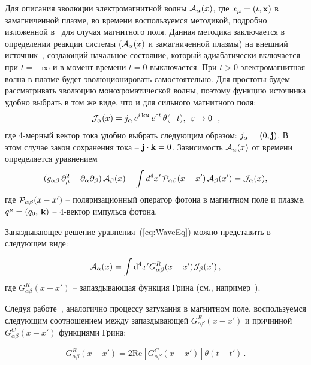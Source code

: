 \documentclass[14pt, russian]{article}
\def\beq{\begin{eqnarray}}
\def\eeq{\end{eqnarray}}
\newcommand{\dd}{\mathrm{d}} %
\begin{document}
Для описания эволюции электромагнитной волны ${\cal A}_{\alpha}(x)$, где $x_\mu = (t, {\bf x})$ в замагниченной плазме, 
во времени воспользуемся методикой, подробно изложенной в~\cite{MikhChist:2001} для случая магнитного поля. Данная методика заключается в определении реакции системы 
(${\cal A}_{\alpha}(x)$ и замагниченной плазмы) на внешний источник~\cite{Kirzhnits:1987}, создающий начальное состояние, который адиабатически включается 
при $t = - \infty$ и в момент времени $t = 0$ выключается. При $t > 0$
электромагнитная волна в плазме будет эволюционировать самостоятельно. Для простоты будем рассматривать эволюцию монохроматической волны, поэтому 
функцию источника удобно выбрать в том же виде, что и для сильного магнитного поля:
%
\beq
{\cal J}_{\alpha}(x) = j_{\alpha}\,e^{i \,{\bf k} {\bf x}}\,
e^{ \varepsilon t}\, \theta(- t), \,\,\, \varepsilon \to 0^+,
\label{eq:1}
\eeq
где 4-мерный вектор тока удобно выбрать следующим образом: $j_{\alpha} = (0, {\bf j})$. В этом случае закон сохранения тока --  ${\bf j} \cdot {\bf k} = 0$.  Зависимость ${\cal A}_{\alpha}(x)$ от времени  определяется уравнением
%
\begin{eqnarray}\label{eq:WaveEq}
(g_{\alpha \beta} \, \partial_{\mu}^2  -
\partial_{\alpha}\partial_{\beta}) \, {\cal A}_{\beta}(x) + 
\int d^4 x'\, {\cal P}_{\alpha \beta} (x - x') \, {\cal A}_{\beta}(x')
= {\cal J}_{\alpha}(x),
\label{eq:2}
\end{eqnarray}
где ${\cal P}_{\alpha \beta} (x - x')$ -- поляризационный оператор фотона в магнитном поле и плазме. $q^{\mu} = (q_0,\, {\bf k})$ -- 4-вектор импульса фотона.


Запаздывающее решение уравнения~(\ref{eq:WaveEq}) можно представить в следующем виде:

\begin{equation}\label{eq:RetSol}
	{\cal A}_\alpha(x)=\int \dd^4 x' G^R_{\alpha \beta}(x-x'){\cal J}_\beta(x')\, ,
\end{equation}
где $G^R_{\alpha \beta}(x-x')$ -- запаздывающая функция Грина (см., например~\cite{Landau:2001}).

Следуя работе~\cite{MikhChist:2001}, аналогично процессу затухания в магнитном поле, воспользуемся следующим соотношением между запаздывающей $G^R_{\alpha\beta}(x-x')$ и причинной $G^C_{\alpha\beta}(x-x')$ функциями Грина:

\begin{equation}\label{eq:RetCasualGreen}
G^R_{\alpha\beta}(x-x')= 2 \mathrm{Re} \left[G^C_{\alpha\beta}(x-x')\right]\theta(t-t')\, .
\end{equation}
\end{document}

